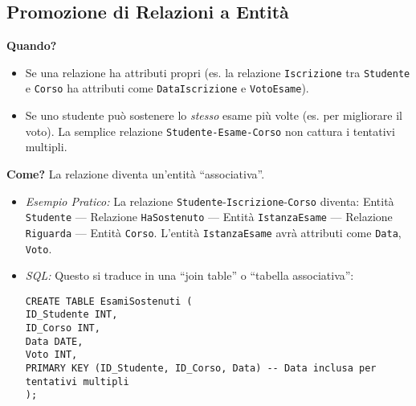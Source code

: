 \subsection{Promozione di Relazioni a Entità}
\textbf{Quando?}
\begin{itemize}
	\item Se una relazione ha attributi propri (es. la relazione \texttt{Iscrizione} tra \texttt{Studente} e \texttt{Corso} ha attributi come \texttt{DataIscrizione} e \texttt{VotoEsame}).
	\item Se uno studente può sostenere lo \textit{stesso} esame più volte (es. per migliorare il voto). La semplice relazione \texttt{Studente-Esame-Corso} non cattura i tentativi multipli.
\end{itemize}
\textbf{Come?} La relazione diventa un'entità ``associativa''.
\begin{itemize}
	\item \textit{Esempio Pratico:} La relazione \texttt{Studente}-\texttt{Iscrizione}-\texttt{Corso} diventa: Entità \texttt{Studente} --- Relazione \texttt{HaSostenuto} --- Entità \texttt{IstanzaEsame} --- Relazione \texttt{Riguarda} --- Entità \texttt{Corso}. L'entità \texttt{IstanzaEsame} avrà attributi come \texttt{Data}, \texttt{Voto}.
	\item \textit{SQL:} Questo si traduce in una ``join table'' o ``tabella associativa'':
	\begin{verbatim}
CREATE TABLE EsamiSostenuti (
ID_Studente INT,
ID_Corso INT,
Data DATE,
Voto INT,
PRIMARY KEY (ID_Studente, ID_Corso, Data) -- Data inclusa per tentativi multipli
);
	\end{verbatim}
\end{itemize}

